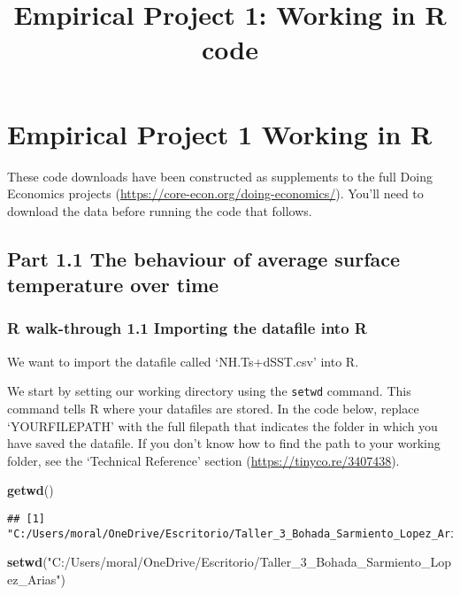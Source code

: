 \documentclass[
]{article}
\title{Empirical Project 1: Working in R code}
\author{}
\date{\vspace{-2.5em}}
\newenvironment{Shaded}{\begin{snugshade}}{\end{snugshade}}
\newcommand{\FunctionTok}[1]{\textcolor[rgb]{0.13,0.29,0.53}{\textbf{#1}}}
\newcommand{\NormalTok}[1]{#1}
\newcommand{\StringTok}[1]{\textcolor[rgb]{0.31,0.60,0.02}{#1}}
\begin{document}
\maketitle

\section{Empirical Project 1 Working in
R}\label{empirical-project-1-working-in-r}

These code downloads have been constructed as supplements to the full
Doing Economics projects (\url{https://core-econ.org/doing-economics/}).
You'll need to download the data before running the code that follows.

\subsection{Part 1.1 The behaviour of average surface temperature over
time}\label{part-1.1-the-behaviour-of-average-surface-temperature-over-time}

\subsubsection{R walk-through 1.1 Importing the datafile into
R}\label{r-walk-through-1.1-importing-the-datafile-into-r}

We want to import the datafile called `NH.Ts+dSST.csv' into R.

We start by setting our working directory using the \texttt{setwd}
command. This command tells R where your datafiles are stored. In the
code below, replace `YOURFILEPATH' with the full filepath that indicates
the folder in which you have saved the datafile. If you don't know how
to find the path to your working folder, see the `Technical Reference'
section (\url{https://tinyco.re/3407438}).

\begin{Shaded}
\begin{Highlighting}[]
\FunctionTok{getwd}\NormalTok{()}
\end{Highlighting}
\end{Shaded}

\begin{verbatim}
## [1] "C:/Users/moral/OneDrive/Escritorio/Taller_3_Bohada_Sarmiento_Lopez_Arias/Code"
\end{verbatim}

\begin{Shaded}
\begin{Highlighting}[]
\FunctionTok{setwd}\NormalTok{(}\StringTok{"C:/Users/moral/OneDrive/Escritorio/Taller\_3\_Bohada\_Sarmiento\_Lopez\_Arias"}\NormalTok{)}
\end{Highlighting}
\end{Shaded}
\end{document}

